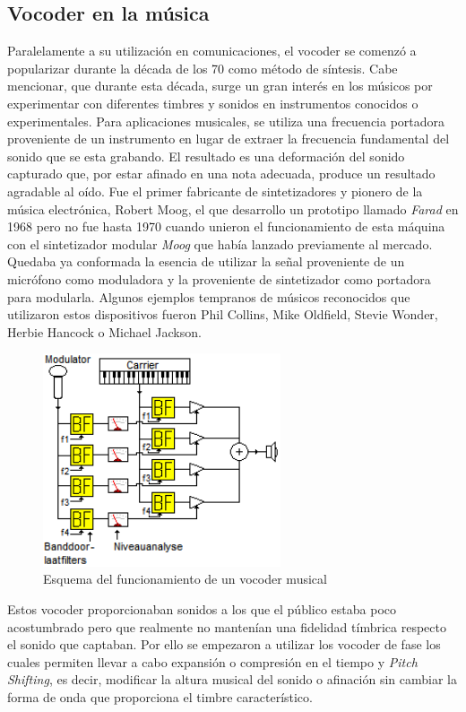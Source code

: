\subsection{Vocoder en la música}
Paralelamente a su utilización en comunicaciones, el vocoder se comenzó a popularizar durante la década de los 70 como método de síntesis. Cabe mencionar, que durante esta década, surge un gran interés en los músicos por experimentar con diferentes timbres y sonidos en instrumentos conocidos o experimentales. Para aplicaciones musicales, se utiliza una frecuencia portadora proveniente de un instrumento en lugar de extraer la frecuencia fundamental del sonido que se esta grabando. El resultado es una deformación del sonido capturado que, por estar afinado en una nota adecuada, produce un resultado agradable al oído. Fue el primer fabricante de sintetizadores y pionero de la música electrónica, Robert Moog, el que desarrollo un prototipo llamado \emph{Farad} en 1968 pero no fue hasta 1970 cuando unieron el funcionamiento de esta máquina con el sintetizador modular \emph{Moog} que había lanzado previamente al mercado. Quedaba ya conformada la esencia de utilizar la señal proveniente de un micrófono como moduladora y la proveniente de sintetizador como portadora para modularla. Algunos ejemplos tempranos de músicos reconocidos  que utilizaron estos dispositivos fueron Phil Collins, Mike Oldfield, Stevie Wonder, Herbie Hancock o Michael Jackson.

\begin{figure}
\begin{center}
\includegraphics[width=7cm]{img/music_vocoder.png}
\caption{Esquema del funcionamiento de un vocoder musical}
\end{center}
\end{figure}

Estos vocoder proporcionaban sonidos a los que el público estaba poco acostumbrado pero que realmente no mantenían una fidelidad tímbrica respecto el sonido que captaban. Por ello se empezaron a utilizar los vocoder de fase los cuales permiten llevar a cabo expansión o compresión en el tiempo y \emph{Pitch Shifting}, es decir, modificar la altura musical del sonido o afinación sin cambiar la forma de onda que proporciona el timbre característico.

